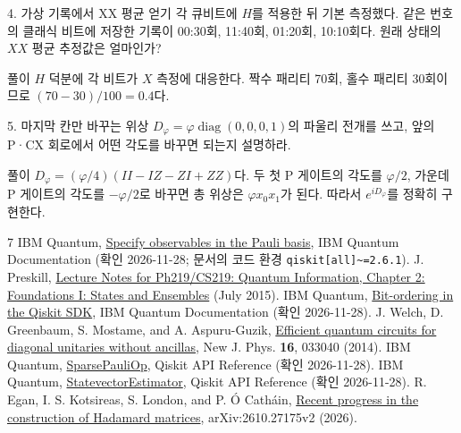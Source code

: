 \begin{questionbox}{4. 가상 기록에서 XX 평균 얻기}
각 큐비트에 \(H\)를 적용한 뒤 기본 측정했다.
같은 번호의 클래식 비트에 저장한 기록이 00:30회, 11:40회, 01:20회, 10:10회다.
원래 상태의 \(XX\) 평균 추정값은 얼마인가?
\end{questionbox}
\begin{answerbox}{풀이}
\(H\) 덕분에 각 비트가 \(X\) 측정에 대응한다.
짝수 패리티 70회, 홀수 패리티 30회이므로 \((70-30)/100=0.4\)다.
\end{answerbox}

\begin{questionbox}{5. 마지막 칸만 바꾸는 위상}
\(D_\varphi=\varphi\operatorname{diag}(0,0,0,1)\)의 파울리 전개를 쓰고,
앞의 P·CX 회로에서 어떤 각도를 바꾸면 되는지 설명하라.
\end{questionbox}
\begin{answerbox}{풀이}
\(D_\varphi=(\varphi/4)(II-IZ-ZI+ZZ)\)다.
두 첫 P 게이트의 각도를 \(\varphi/2\), 가운데 P 게이트의 각도를
\(-\varphi/2\)로 바꾸면 총 위상은 \(\varphi x_0x_1\)가 된다.
따라서 \(e^{iD_\varphi}\)를 정확히 구현한다.
\end{answerbox}

\begin{thebibliography}{7}
 IBM Quantum, \href{https://quantum.cloud.ibm.com/docs/en/qiskit/specify-observables-pauli}{Specify observables in the Pauli basis}, IBM Quantum Documentation (확인 2026-11-28; 문서의 코드 환경 \texttt{qiskit[all]\textasciitilde{}=2.6.1}).
 J. Preskill, \href{https://www.preskill.caltech.edu/ph219/chap2_15.pdf}{Lecture Notes for Ph219/CS219: Quantum Information, Chapter 2: Foundations I: States and Ensembles} (July 2015).
 IBM Quantum, \href{https://quantum.cloud.ibm.com/docs/en/qiskit/bit-ordering}{Bit-ordering in the Qiskit SDK}, IBM Quantum Documentation (확인 2026-11-28).
 J. Welch, D. Greenbaum, S. Mostame, and A. Aspuru-Guzik, \href{https://doi.org/10.1088/1367-2630/16/3/033040}{Efficient quantum circuits for diagonal unitaries without ancillas}, New J. Phys. \textbf{16}, 033040 (2014).
 IBM Quantum, \href{https://quantum.cloud.ibm.com/docs/en/api/qiskit/qiskit.quantum_info.SparsePauliOp}{SparsePauliOp}, Qiskit API Reference (확인 2026-11-28).
 IBM Quantum, \href{https://quantum.cloud.ibm.com/docs/en/api/qiskit/qiskit.primitives.StatevectorEstimator}{StatevectorEstimator}, Qiskit API Reference (확인 2026-11-28).
 R. Egan, I. S. Kotsireas, S. London, and P. Ó Catháin, \href{https://arxiv.org/abs/2610.27175v2}{Recent progress in the construction of Hadamard matrices}, arXiv:2610.27175v2 (2026).
\end{thebibliography}


